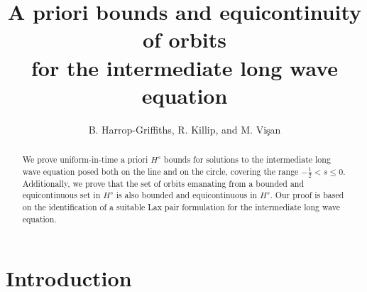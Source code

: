 \documentclass{amsart}
\theoremstyle{definition}
\theoremstyle{remark}
\begin{document}
\title[A priori bounds and equicontinuity for ILW]{A priori bounds and equicontinuity of orbits\\for the intermediate long wave equation}
\author{B. Harrop-Griffiths, R. Killip, and M. Vi\c{s}an}

\address
{Benjamin Harrop-Griffiths\\
Department of Mathematics and Statistics\\
Georgetown University, DC 20057, USA}

\address
{Rowan Killip\\
CEREMADE, CNRS\\Universit\'e Paris Dauphine--PSL\\ Place du
Mar\'echal de Lattre de Tassigny\\ 75016 Paris\\ France \& Department
of Mathematics\\ University of California\\Los Angeles\\CA 90095\\USA}

\address
{Monica Vi\c{s}an\\
Department of Mathematics\\
University of California, Los Angeles, CA 90095, USA}




\begin{abstract}
We prove uniform-in-time a priori $H^s$ bounds for solutions to the intermediate long wave equation posed both on the line and on the circle, covering the range $-\frac12<s\leq0$.   Additionally, we prove that the set of orbits emanating from a bounded and equicontinuous set in $H^s$ is also bounded and equicontinuous in $H^s$.  Our proof is based on the identification of a suitable Lax pair formulation for the intermediate long wave equation.
\end{abstract}

\maketitle

\section{Introduction}
\end{document}
